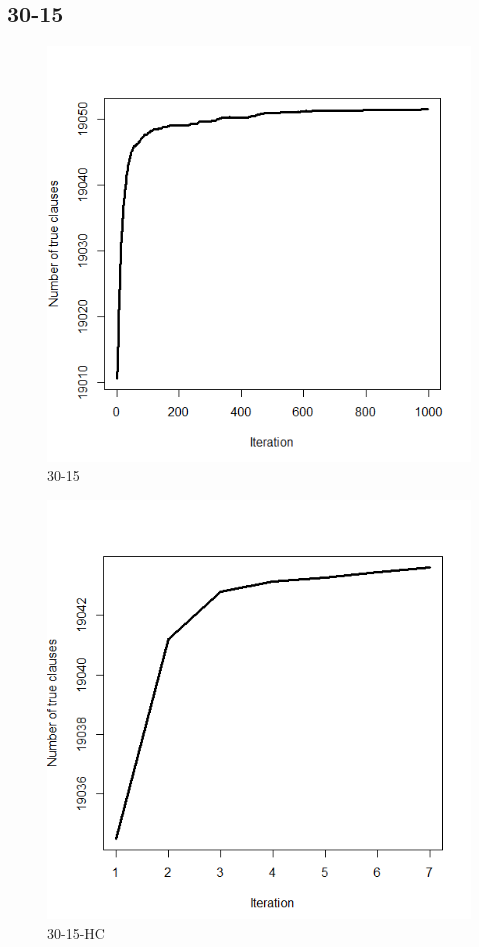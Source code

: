 \documentclass{article}
\begin{document}
\subsection{30-15}
\begin{figure}[H]
  \includegraphics[width=\linewidth]{30-15.png}
  \caption{30-15}
\end{figure}
\begin{figure}[H]
  \includegraphics[width=\linewidth]{30-15-HC.png}
  \caption{30-15-HC}
\end{figure}
\end{document}
